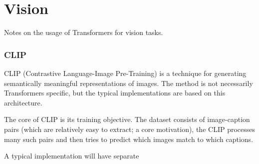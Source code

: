 \part{Vision}

Notes on the usage of Transformers for vision tasks.


\section{CLIP}

CLIP (Contrastive Language-Image Pre-Training) \cite{radford2021learningtransferablevisualmodels} is
a technique for generating semantically meaningful representations of images. The method is not
necessarily Transformers specific, but the typical implementations are based on this architecture.

The core of CLIP is its training objective. The dataset consists of image-caption pairs (which are
relatively easy to extract; a core motivation), the CLIP processes many such pairs and then tries to
predict which images match to which captions.

A typical implementation will have separate

